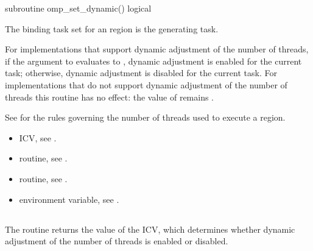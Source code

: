 \begin{samepage}
\fortranspecificstart
\begin{boxedcode}
subroutine omp\_set\_dynamic()
logical 
\end{boxedcode}
\fortranspecificend
\end{samepage}

\binding
The binding task set for an  region is the generating task. 

\effect
For implementations that support dynamic adjustment of the number of threads, if the 
argument to  evaluates to , dynamic adjustment is enabled for 
the current task; otherwise, dynamic adjustment is disabled for the current task. For 
implementations that do not support dynamic adjustment of the number of threads this 
routine has no effect: the value of  remains .

See  
for the rules governing the number of threads used to 
execute a\linebreak {} region. 

\crossreferences
\begin{itemize}
\item {} ICV, see 
.

\item {} routine, see 
.

\item {} routine, see 
.

\item {} environment variable, see 
.
\end{itemize}








\subsection{}
\label{subsec:omp_get_dynamic}
\summary
The  routine returns the value of the  ICV, which 
determines whether dynamic adjustment of the number of threads is enabled or disabled.

